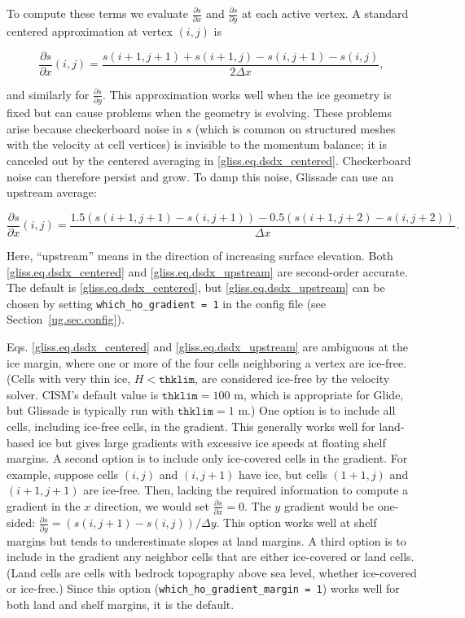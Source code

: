 {\noindent
To compute these terms we evaluate $\frac{\partial s}{\partial x}$ and $\frac{\partial s}{\partial y}$
at each active vertex.  A standard centered approximation at vertex $(i,j)$ is

\begin{equation}
  \label{gliss.eq.dsdx_centered}
  \frac{\partial s}{\partial x}(i,j) = \frac{s(i+1,j+1)+s(i+1,j)-s(i,j+1)-s(i,j)}{2\Delta x},
\end{equation}

\noindent
and similarly for $\frac{\partial s}{\partial y}$. This approximation works
well when the ice geometry is fixed but can cause problems when the geometry is evolving.
These problems arise because checkerboard noise in $s$ (which is common on structured meshes
with the velocity at cell vertices) is invisible to the momentum balance; 
it is canceled out by the centered averaging in \eqref{gliss.eq.dsdx_centered}.
Checkerboard noise can therefore persist and grow.  To damp this noise, Glissade 
can use an upstream average:

\begin{equation}
  \label{gliss.eq.dsdx_upstream}
  \frac{\partial s}{\partial x}(i,j) = \frac{1.5 (s(i+1,j+1) - s(i,j+1)) - 0.5 (s(i+1,j+2) - s(i,j+2))}{\Delta x}.
\end{equation}

\noindent
Here, ``upstream'' means in the direction of increasing surface elevation. Both \eqref{gliss.eq.dsdx_centered}
and \eqref{gliss.eq.dsdx_upstream} are second-order accurate.  The default is \eqref{gliss.eq.dsdx_centered},
but \eqref{gliss.eq.dsdx_upstream} can be chosen by setting \texttt{which\_ho\_gradient = 1} 
in the config file (see Section~\ref{ug.sec.config}).

Eqs. \eqref{gliss.eq.dsdx_centered} and \eqref{gliss.eq.dsdx_upstream} are ambiguous at the ice margin,
where one or more of the four cells neighboring a vertex are ice-free. (Cells with very thin ice,
$H < \texttt{thklim}$, are considered ice-free by the velocity solver. CISM's default value is $\texttt{thklim} = 100 \textrm{ m}$,
which is appropriate for Glide, but Glissade is typically run with $\texttt{thklim} = 1 \textrm{ m}$.)
One option is to include all cells, including ice-free cells, in the gradient.
This generally works well for land-based ice but gives large gradients with excessive ice speeds
at floating shelf margins.  A second option is to include only ice-covered cells in the gradient.
For example, suppose cells $(i,j)$ and $(i,j+1)$ have ice, but cells $(1+1,j)$ and $(i+1,j+1)$ are
ice-free.  Then, lacking the required information to compute a gradient in the $x$ direction, 
we would set $\frac{\partial s}{\partial x} = 0$.  The $y$ gradient would be one-sided:
$\frac{\partial s}{\partial y} = (s(i,j+1)-s(i,j)) \slash \Delta y$.  
This option works well at shelf margins but tends to underestimate slopes at land margins.
A third option is to include in the gradient any neighbor cells that are either ice-covered
or land cells.  (Land cells are cells with bedrock topography above sea level, whether ice-covered
or ice-free.)  Since this option (\texttt{which\_ho\_gradient\_margin = 1})
works well for both land and shelf margins, it is the default. 
    
}
